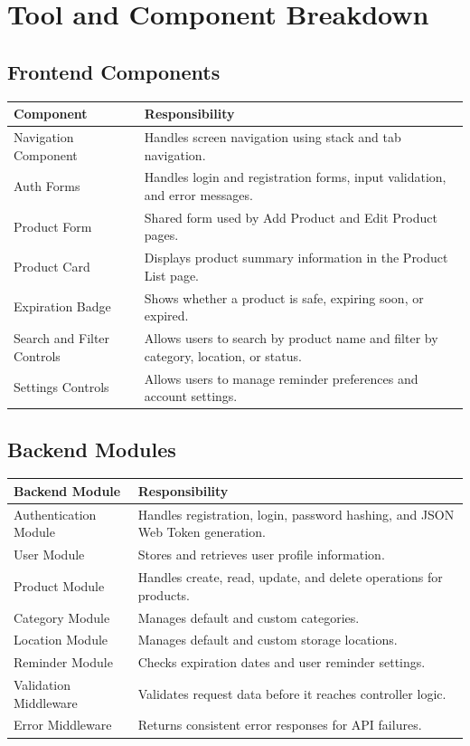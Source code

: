 \documentclass[12pt]{article}
\begin{document}
\section{Tool and Component Breakdown}

\subsection{Frontend Components}
\begin{longtable}{|p{}|p{}|}
\hline
\textbf{Component} & \textbf{Responsibility} \\
\hline
Navigation Component & Handles screen navigation using stack and tab navigation. \\
\hline
Auth Forms & Handles login and registration forms, input validation, and error messages. \\
\hline
Product Form & Shared form used by Add Product and Edit Product pages. \\
\hline
Product Card & Displays product summary information in the Product List page. \\
\hline
Expiration Badge & Shows whether a product is safe, expiring soon, or expired. \\
\hline
Search and Filter Controls & Allows users to search by product name and filter by category, location, or status. \\
\hline
Settings Controls & Allows users to manage reminder preferences and account settings. \\
\hline
\end{longtable}

\subsection{Backend Modules}
\begin{longtable}{|p{}|p{}|}
\hline
\textbf{Backend Module} & \textbf{Responsibility} \\
\hline
Authentication Module & Handles registration, login, password hashing, and JSON Web Token generation. \\
\hline
User Module & Stores and retrieves user profile information. \\
\hline
Product Module & Handles create, read, update, and delete operations for products. \\
\hline
Category Module & Manages default and custom categories. \\
\hline
Location Module & Manages default and custom storage locations. \\
\hline
Reminder Module & Checks expiration dates and user reminder settings. \\
\hline
Validation Middleware & Validates request data before it reaches controller logic. \\
\hline
Error Middleware & Returns consistent error responses for API failures. \\
\hline
\end{longtable}
\end{document}
